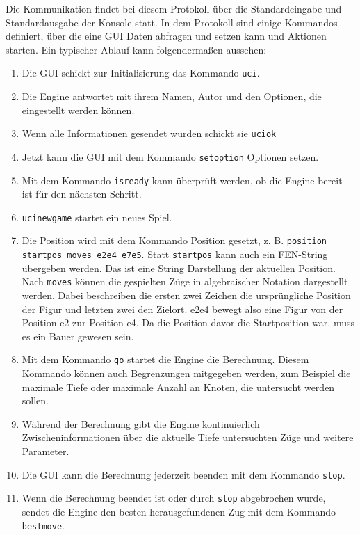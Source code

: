 Die Kommunikation findet bei diesem Protokoll über die Standardeingabe und Standardausgabe der Konsole statt. In dem Protokoll sind einige Kommandos definiert, über die eine GUI Daten abfragen und setzen kann und Aktionen starten. Ein typischer Ablauf kann folgendermaßen aussehen:
\begin{enumerate}
    \item Die GUI schickt zur Initialisierung das Kommando \lstinline{uci}.
    \item Die Engine antwortet mit ihrem Namen, Autor und den Optionen, die eingestellt werden können.
    \item Wenn alle Informationen gesendet wurden schickt sie \lstinline{uciok}
    \item Jetzt kann die GUI mit dem Kommando \lstinline{setoption} Optionen setzen.
    \item Mit dem Kommando \lstinline{isready} kann überprüft werden, ob die Engine bereit ist für den nächsten Schritt.
    \item \lstinline{ucinewgame} startet ein neues Spiel.
    \item Die Position wird mit dem Kommando Position gesetzt, z. B. \lstinline{position startpos moves e2e4 e7e5}. Statt \lstinline{startpos} kann auch ein FEN-String übergeben werden. Das ist eine String Darstellung der aktuellen Position. Nach \lstinline{moves} können die gespielten Züge in algebraischer Notation dargestellt werden. Dabei beschreiben die ersten zwei Zeichen die ursprüngliche Position der Figur und letzten zwei den Zielort. e2e4 bewegt also eine Figur von der Position e2 zur Position e4. Da die Position davor die Startposition war, muss es ein Bauer gewesen sein.
    \item Mit dem Kommando \lstinline{go} startet die Engine die Berechnung. Diesem Kommando können auch Begrenzungen mitgegeben werden, zum Beispiel die maximale Tiefe oder maximale Anzahl an Knoten, die untersucht werden sollen.
    \item Während der Berechnung gibt die Engine kontinuierlich Zwischeninformationen über die aktuelle Tiefe untersuchten Züge und weitere Parameter.
    \item Die GUI kann die Berechnung jederzeit beenden mit dem Kommando \lstinline{stop}.
    \item Wenn die Berechnung beendet ist oder durch \lstinline{stop} abgebrochen wurde, sendet die Engine den besten herausgefundenen Zug mit dem Kommando \lstinline{bestmove}.
\end{enumerate}
\cite{stefan_meyer-kahlen_universal_2025}

